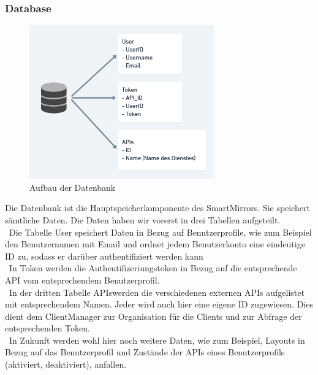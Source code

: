 \subsubsection{Database}
\begin{figure}[h]
\centering
\includegraphics[width=80mm]{pictures/Database.png}
\caption{Aufbau der Datenbank}
\end{figure}
Die Datenbank ist die Hauptspeicherkomponente des SmartMirrors. Sie speichert sämtliche Daten. Die Daten haben wir vorerst in drei Tabellen aufgeteilt.\\\
Die Tabelle \dq User \dq speichert Daten in Bezug auf Benutzerprofile, wie zum Beispiel den Benutzernamen mit Email und ordnet jedem Benutzerkonto eine eindeutige ID zu, sodass er darüber authentifiziert werden kann\\\
In \dq Token \dq werden die Authentifizeriungstoken in Bezug auf die entsprechende API vom entsprechendem Benutzerprofil.\\\
In der dritten Tabelle \dq APIs\dq werden die verschiedenen externen APIs aufgelistet mit entsprechendem Namen. Jeder wird auch hier eine eigene ID zugewiesen. Dies dient dem ClientManager zur Organisation für die Clients und zur Abfrage der entsprechenden Token.\\\
In Zukunft werden wohl hier noch weitere Daten, wie zum Beispiel, Layouts in Bezug auf das Benutzerprofil und Zustände der APIs eines Benutzerprofils (aktiviert, deaktiviert), anfallen.

